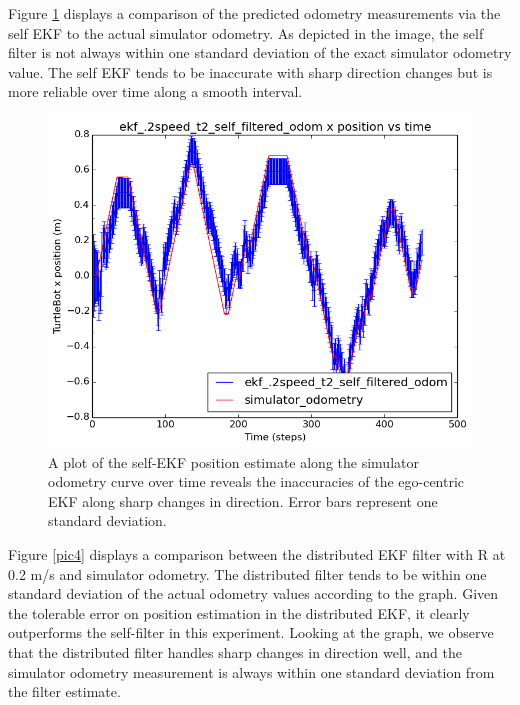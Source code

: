 \documentclass[conference]{IEEEtran} \usepackage[T1]{fontenc} \usepackage[backend=biber, style=ieee]{biblatex}
\begin{document}
Figure \ref{pic3} displays a comparison of the predicted odometry measurements via the self EKF to the actual simulator 
odometry. As depicted in the image, the self filter is not always within one standard deviation of the exact simulator 
odometry value. The self EKF tends to be inaccurate with sharp direction changes but is more reliable over time along a smooth interval.

\begin{figure}

\centering 
\includegraphics[scale=.45]{ekf_2speed_t2_self_filtered_odom_pos_err_graph}
\caption {A plot of the self-EKF position estimate along the simulator odometry curve over time 
reveals the inaccuracies of the ego-centric EKF along sharp changes in direction. Error bars represent one standard deviation.}
\label{pic3} 
\end{figure}

\par
Figure \ref{pic4} displays a comparison between the distributed EKF filter with R at 0.2 m/s and simulator odometry. The 
distributed filter tends to be within one standard deviation of the actual odometry values according to the graph. 
Given the tolerable error on position estimation in the distributed EKF, it clearly outperforms the self-filter 
in this experiment. Looking at the graph, we observe that the distributed filter handles sharp changes in direction well, and the simulator odometry measurement is always within one standard deviation from the filter estimate.
\end{document}
